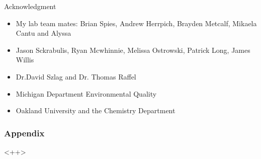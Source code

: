 \begin{frame}{Acknowledgment}

	\begin{itemize} 
		\item My lab team mates: Brian Spies, Andrew Herrpich, Brayden Metcalf, Mikaela Cantu and Alyssa
		\item Jason Sckrabulis, Ryan Mcwhinnie, Melissa Ostrowski, Patrick Long, James Willis
		\item Dr.David Szlag and Dr. Thomas Raffel
		\item Michigan Department Environmental Quality
		\item Oakland University and the Chemistry Department
	\end{itemize}

\end{frame}

\begin{frame}
	\frametitle{Appendix}

	

\end{frame}

<++>
